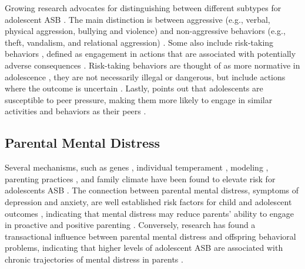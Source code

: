 \documentclass{sn-jnl}                  %
\begin{document}
Growing research advocates for distinguishing between different subtypes for adolescent ASB \citep{burt:2012, burt:2009, kornienko:2019}. The main distinction is between aggressive (e.g., verbal, physical aggression, bullying and violence) and non-aggressive behaviors (e.g., theft, vandalism, and relational aggression) \citep{burt:2016, kornienko:2019, little:2003}. Some also include risk-taking behaviors \citep{mishra:2008}, defined as engagement in actions that are associated with potentially adverse consequences \citep{boyer:2006}. Risk-taking behaviors are thought of as more normative in adolescence \citep{moffitt:2018, sundell:2019}, they are not necessarily illegal or dangerous, but include actions where the outcome is uncertain \citep{ciranka:2021}. Lastly, \citet{steinberg:2004} points out that adolescents are  susceptible to peer pressure, making them more likely to engage in similar activities and behaviors as their peers \citep{ciranka:2021}.

\subsection{Parental Mental Distress}

Several mechanisms, such as genes \citep{burt:2003, moffitt:2015}, individual temperament \citep{dadds:2003}, modeling \citep{garber:2005, vanloon:2014}, parenting practices \citep{romm:2022, sun:2021}, and family climate \citep{cummings:2000, patterson:2002} have been found to elevate risk for adolescents ASB \citep{fosco:2019}. The connection between parental mental distress, symptoms of depression and anxiety, are well established risk factors for child and adolescent outcomes \citep[e.g., ][]{cummings:1994, goodman:2006, hails:2018, hawes:2005}, indicating that mental distress may reduce parents' ability to engage in proactive and positive parenting \citep{elgar:2007, joyner:2021}. Conversely, research has found a transactional influence between parental mental distress and offspring behavioral problems, indicating that higher levels of adolescent ASB are associated with chronic trajectories of mental distress in parents \citep{elgar:2007, korhonen:2014, xu:2017}.
\end{document}
